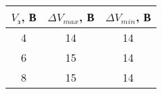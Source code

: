 \begin{tabular}{c|c|c}
\toprule
$V_\text{з}$, В & $\Delta V_{max}$, В & $\Delta V_{min}$, В \\
\midrule
4 & 14 & 14 \\
6 & 15 & 14 \\
8 & 15 & 14 \\
\bottomrule
\end{tabular}
